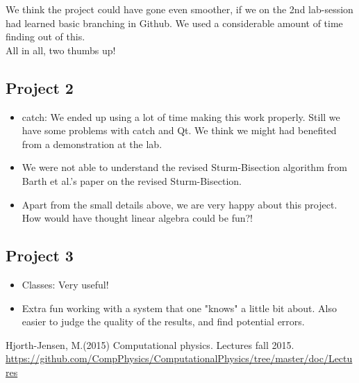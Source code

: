 \documentclass{article}
\begin{document}
We think the project could have gone even smoother, if we on the 2nd lab-session had learned basic branching in Github. We used a considerable amount of time finding out of this.\\

All in all, two thumbs up!

\subsection{Project 2}
\begin{itemize}
	\item  catch: We ended up using a lot of time making this work properly. Still we have some problems with catch and Qt. We think we might had benefited from a demonstration at the lab.
	
	\item We were not able to understand the revised Sturm-Bisection algorithm from Barth et al.'s \cite{barth} paper on the revised Sturm-Bisection. 
	
	\item Apart from the small details above, we are very happy about this project. How would have thought linear algebra could be fun?!
\end{itemize}

\subsection{Project 3}
\begin{itemize}
	\item  Classes: Very useful!
	
	\item Extra fun working with a system that one "knows" a little bit about. Also easier to judge the quality of the results, and find potential errors.
\end{itemize}













\pagebreak
\begin{thebibliography}{9}
	Hjorth-Jensen, M.(2015)
	Computational physics. Lectures fall 2015. 
	\url{https://github.com/CompPhysics/ComputationalPhysics/tree/master/doc/Lectures}
	

	


\end{thebibliography}
\end{document}
